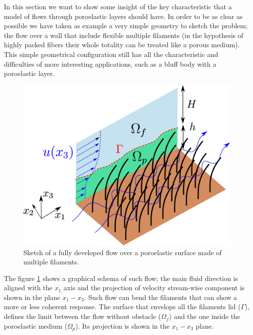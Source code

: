 In this section we want to show some insight of the key characteristic that a model of flows through poroelastic layers should have.
In order to be as clear as possible we have taken as example a very simple geometry to sketch the problem; the flow over a wall that include flexible multiple filaments (in the hypothesis of highly packed fibers their whole totality can be treated like a porous medium). 
This simple geometrical configuration still has all the characteristic and difficulties of more interesting applications, such as a bluff body with a poroelastic layer.

\begin{figure}[h]
	\centering
	\includegraphics[width=0.7\linewidth]{chapter_1/problem_schema}
	\caption{Sketch of a fully developed flow over a poroelastic surface made of multiple filaments.}
	\label{fig:schema_problem}
\end{figure}

The figure \ref{fig:schema_problem} shows a graphical schema of such flow; the main fluid direction is aligned with the $x_1$ axis and the projection of velocity stream-wise component is shown in the plane $x_1 - x_3$.
Such flow can bend the filaments that can show a more or less coherent response.
The surface that envelops all the filaments lid ($\Gamma$), defines the limit between the flow without obstacle ($\Omega_{f}$) and the one inside the poroelastic medium ($\Omega_{p}$). Its projection is shown in the  $x_1 - x_3$ plane.

